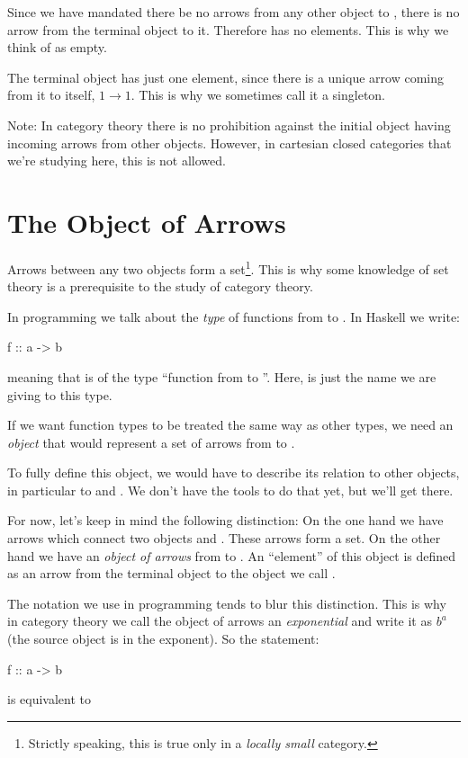 \documentclass[DaoFP]{subfiles}
\begin{document}
Since we have mandated there be no arrows from any other object to , there is no arrow from the terminal object to it. Therefore  has no elements. This is why we think of  as empty.

The terminal object has just one element, since there is a unique arrow coming from it to itself, $ 1 \to 1$. This is why we sometimes call it a singleton. 

Note: In category theory there is no prohibition against the initial object having incoming arrows from other objects. However, in cartesian closed categories that we're studying here, this is not allowed.

\section{The Object of Arrows}

Arrows between any two objects form a set\footnote{Strictly speaking, this is true only in a \emph{locally small} category.}. This is why some knowledge of set theory is a prerequisite to the study of category theory. 

In programming we talk about the \emph{type} of functions from  to . In Haskell we write:
\begin{haskell}
f :: a -> b
\end{haskell}
meaning that  is of the type ``function from  to ''. Here,  is just the name we are giving to this type. 

If we want function types to be treated the same way as other types, we need an \emph{object} that would represent a set of arrows from  to .

To fully define this object, we would have to describe its relation to other objects, in particular to  and . We don't have the tools to do that yet, but we'll get there. 

For now, let's keep in mind the following distinction: On the one hand we have arrows which connect two objects  and . These arrows form a set. On the other hand we have an \emph{object of arrows} from   to . An ``element'' of this object is defined as an arrow from the terminal object \hask{()} to the object we call . 

The notation we use in programming tends to blur this distinction. This is why in category theory we call the object of arrows an \emph{exponential} and write it as $ b^a$ (the source object is in the exponent). So the statement:
\begin{haskell}
f :: a -> b
\end{haskell}
is equivalent to
\end{document}
